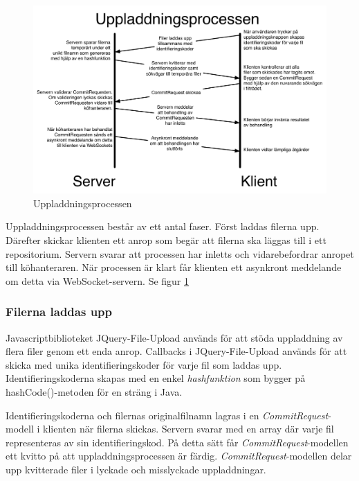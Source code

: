 \begin{figure}
  \includegraphics[width=15.0cm]{fig/misc/uppladdningsprocessen.pdf}             
  \caption[Uppladdningsprocessen]
  {Uppladdningsprocessen}
  \label{fig:uppladdning}
\end{figure}


Uppladdningsprocessen består av ett antal faser. Först laddas filerna upp. Därefter skickar klienten ett anrop som begär att filerna ska läggas till i ett repositorium. Servern svarar att processen har inletts och vidarebefordrar anropet till köhanteraren. När processen är klart får klienten ett asynkront meddelande om detta via WebSocket-servern. Se figur \ref{fig:uppladdning}

\subsubsection{Filerna laddas upp}

Javascriptbiblioteket JQuery-File-Upload används för att stöda uppladdning av flera filer genom ett enda anrop. 
Callbacks i JQuery-File-Upload används för att skicka med unika identifieringskoder för varje fil som laddas upp. Identifieringskoderna skapas med en enkel \emph{hashfunktion} som bygger på hashCode()-metoden för en sträng i Java.

Identifieringskoderna och filernas originalfilnamn lagras i en \emph{CommitRequest}-modell i klienten när filerna skickas. Servern svarar med en array där varje fil representeras av sin identifieringskod. På detta sätt får \emph{CommitRequest}-modellen ett kvitto på att uppladdningsprocessen är färdig. \emph{CommitRequest}-modellen delar upp kvitterade filer i lyckade och misslyckade uppladdningar. 

